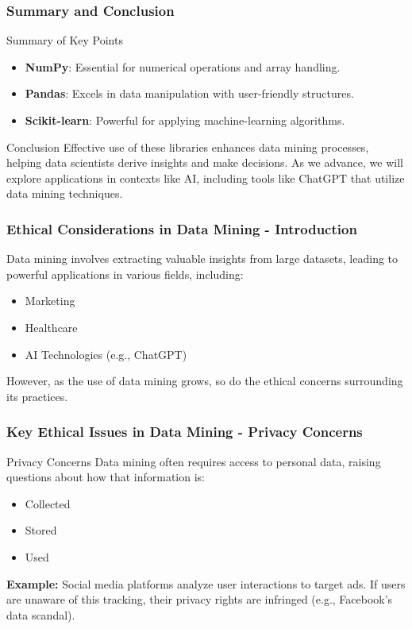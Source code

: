 \documentclass[aspectratio=169]{beamer}
\begin{document}
\begin{frame}[fragile]
    \frametitle{Summary and Conclusion}
    \begin{block}{Summary of Key Points}
        \begin{itemize}
            \item \textbf{NumPy}: Essential for numerical operations and array handling.
            \item \textbf{Pandas}: Excels in data manipulation with user-friendly structures.
            \item \textbf{Scikit-learn}: Powerful for applying machine-learning algorithms.
        \end{itemize}
    \end{block}
    \begin{block}{Conclusion}
        Effective use of these libraries enhances data mining processes, helping data scientists derive insights and make decisions. As we advance, we will explore applications in contexts like AI, including tools like ChatGPT that utilize data mining techniques.
    \end{block}
\end{frame}

\begin{frame}[fragile]
    \frametitle{Ethical Considerations in Data Mining - Introduction}
    Data mining involves extracting valuable insights from large datasets, leading to powerful applications in various fields, including:
    \begin{itemize}
        \item Marketing
        \item Healthcare
        \item AI Technologies (e.g., ChatGPT)
    \end{itemize}
    \vspace{0.2cm}
    However, as the use of data mining grows, so do the ethical concerns surrounding its practices.
\end{frame}

\begin{frame}[fragile]
    \frametitle{Key Ethical Issues in Data Mining - Privacy Concerns}
    \begin{block}{Privacy Concerns}
        Data mining often requires access to personal data, raising questions about how that information is:
        \begin{itemize}
            \item Collected
            \item Stored
            \item Used
        \end{itemize}
    \end{block}
    \vspace{0.2cm}
    \textbf{Example:} Social media platforms analyze user interactions to target ads. If users are unaware of this tracking, their privacy rights are infringed (e.g., Facebook's data scandal).
\end{frame}
\end{document}
